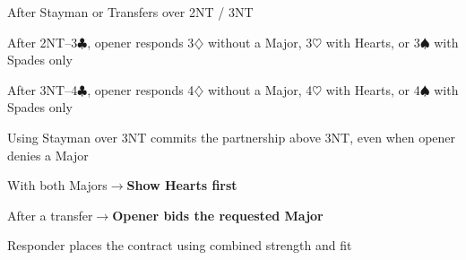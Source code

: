 \documentclass[10pt,letterpaper]{article}
\newcommand{\C}{\ensuremath{\clubsuit}}
\newcommand{\D}{\ensuremath{\diamondsuit}}
\newcommand{\Hh}{\ensuremath{\heartsuit}}
\renewcommand{\S}{\ensuremath{\spadesuit}}
\begin{document}
\begin{minipage}[t]{0.485\textwidth}
\begin{guidecard}{After Stayman or Transfers over 2NT / 3NT}
\begin{branches}
\item After 2NT--3\C{}, opener responds 3\D{} without a Major, 3\Hh{} with Hearts, or 3\S{} with Spades only
\item After 3NT--4\C{}, opener responds 4\D{} without a Major, 4\Hh{} with Hearts, or 4\S{} with Spades only
\begin{branches}
\item Using Stayman over 3NT commits the partnership above 3NT, even when opener denies a Major
\end{branches}
\item With both Majors\;\ensuremath{\longrightarrow}\;\textbf{Show Hearts first}
\item After a transfer\;\ensuremath{\longrightarrow}\;\textbf{Opener bids the requested Major}
\item Responder places the contract using combined strength and fit
\end{branches}
\end{guidecard}

\end{minipage}
\end{document}
